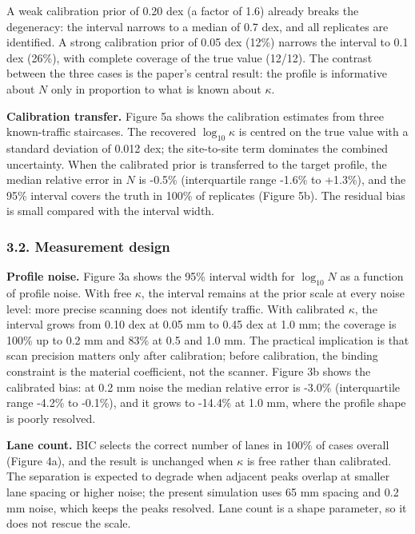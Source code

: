 \documentclass[
]{article}
\begin{document}
A weak calibration prior of 0.20 dex (a factor of 1.6) already breaks
the degeneracy: the interval narrows to a median of 0.7 dex, and all
replicates are identified. A strong calibration prior of 0.05 dex (12\%)
narrows the interval to 0.1 dex (26\%), with complete coverage of the
true value (12/12). The contrast between the three cases is the paper's
central result: the profile is informative about \(N\) only in
proportion to what is known about \(\kappa\).

\textbf{Calibration transfer.} Figure 5a shows the calibration estimates
from three known-traffic staircases. The recovered \(\log_{10}\kappa\)
is centred on the true value with a standard deviation of 0.012 dex; the
site-to-site term dominates the combined uncertainty. When the
calibrated prior is transferred to the target profile, the median
relative error in \(N\) is -0.5\% (interquartile range -1.6\% to
+1.3\%), and the 95\% interval covers the truth in 100\% of replicates
(Figure 5b). The residual bias is small compared with the interval
width.

\subsubsection{3.2. Measurement design}\label{measurement-design}

\textbf{Profile noise.} Figure 3a shows the 95\% interval width for
\(\log_{10}N\) as a function of profile noise. With free \(\kappa\), the
interval remains at the prior scale at every noise level: more precise
scanning does not identify traffic. With calibrated \(\kappa\), the
interval grows from 0.10 dex at 0.05 mm to 0.45 dex at 1.0 mm; the
coverage is 100\% up to 0.2 mm and 83\% at 0.5 and 1.0 mm. The practical
implication is that scan precision matters only after calibration;
before calibration, the binding constraint is the material coefficient,
not the scanner. Figure 3b shows the calibrated bias: at 0.2 mm noise
the median relative error is -3.0\% (interquartile range -4.2\% to
-0.1\%), and it grows to -14.4\% at 1.0 mm, where the profile shape is
poorly resolved.

\textbf{Lane count.} BIC selects the correct number of lanes in 100\% of
cases overall (Figure 4a), and the result is unchanged when \(\kappa\)
is free rather than calibrated. The separation is expected to degrade
when adjacent peaks overlap at smaller lane spacing or higher noise; the
present simulation uses 65 mm spacing and 0.2 mm noise, which keeps the
peaks resolved. Lane count is a shape parameter, so it does not rescue
the scale.
\end{document}
